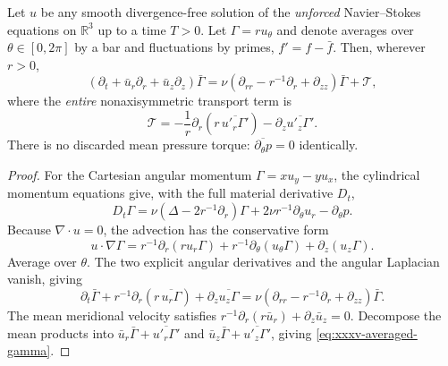 \begin{theorem}
\label{thm:xxxv-angular-mean}
Let $u$ be any smooth divergence-free solution of the
\emph{unforced} Navier--Stokes equations on $\mathbb R^3$
up to a time $T>0$. Let
$\Gamma=r u_\theta$ and denote averages over
$\theta\in[0,2\pi]$ by a bar and fluctuations by
primes, $f'=f-\bar f$. Then, wherever $r>0$,
\begin{equation}\label{eq:xxxv-averaged-gamma}
\boxed{
(\partial_t+\bar u_r\partial_r+\bar u_z\partial_z)
\bar\Gamma=
\nu(\partial_{rr}-r^{-1}\partial_r+\partial_{zz})
\bar\Gamma+\mathcal T,
}
\end{equation}
where the \emph{entire} nonaxisymmetric transport term is
\begin{equation}\label{eq:xxxv-torque}
\boxed{\qquad
\mathcal T=
-\frac1r\partial_r(r\,\overline{u'_r\Gamma'})
-\partial_z\overline{u'_z\Gamma'}.\qquad}
\end{equation}
There is no discarded mean pressure torque:
$\overline{\partial_\theta p}=0$ identically.
\end{theorem}
\begin{proof}
For the Cartesian angular momentum
$\Gamma=xu_y-yu_x$, the cylindrical momentum equations
give, with the full material derivative $D_t$,
\[
D_t\Gamma=
\nu(\Delta-2r^{-1}\partial_r)\Gamma+
2\nu r^{-1}\partial_\theta u_r-\partial_\theta p.
\]
Because $\nabla\cdot u=0$, the advection has the
conservative form
\[
u\cdot\nabla\Gamma
=r^{-1}\partial_r(ru_r\Gamma)+
r^{-1}\partial_\theta(u_\theta\Gamma)+
\partial_z(u_z\Gamma).
\]
Average over $\theta$. The two explicit angular
derivatives and the angular Laplacian vanish, giving
\[
\partial_t\bar\Gamma+
r^{-1}\partial_r(r\,\overline{u_r\Gamma})+
\partial_z\overline{u_z\Gamma}
=\nu(\partial_{rr}-r^{-1}\partial_r+\partial_{zz})
\bar\Gamma.
\]
The mean meridional velocity satisfies
$r^{-1}\partial_r(r\bar u_r)+\partial_z\bar u_z=0$.
Decompose the mean products into
$\bar u_r\bar\Gamma+\overline{u'_r\Gamma'}$
and $\bar u_z\bar\Gamma+\overline{u'_z\Gamma'}$,
giving \eqref{eq:xxxv-averaged-gamma}.
\end{proof}

